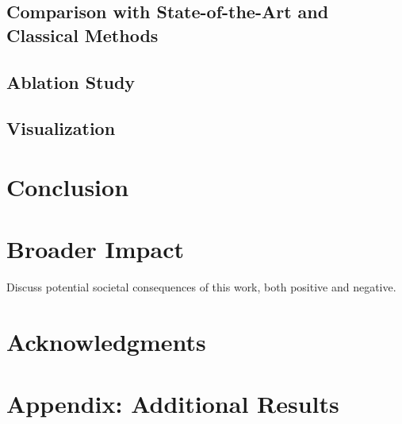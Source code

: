 \documentclass{article}
\begin{document}
\subsection{Comparison with State-of-the-Art and Classical Methods}
\label{sec:exp-main}

\subsection{Ablation Study}
\label{sec:exp-ablation}


\subsection{Visualization}
\label{sec:exp-visual}


\section{Conclusion}
\label{sec:conclusion}


\section*{Broader Impact}

Discuss potential societal consequences of this work, both positive and negative.

\section*{Acknowledgments}

{
  \small
  
  
}

\appendix
\section{Appendix: Additional Results}
\label{sec:appendix}

\end{document}
